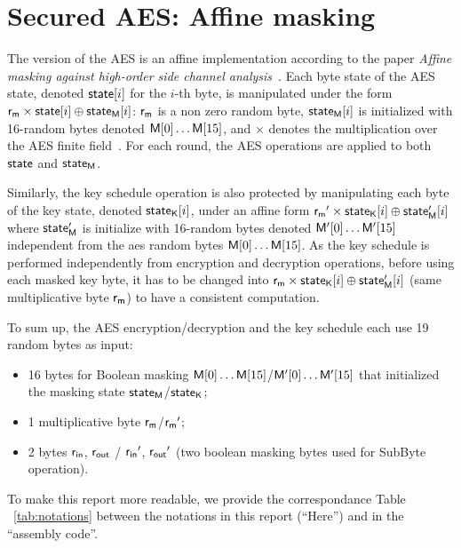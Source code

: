 \section{Secured AES: Affine masking}
\label{sec:secured_aes}
The version of the AES is an affine implementation according to the paper \emph{Affine masking against high-order side channel analysis}~\cite{FMPR10a}. 
Each byte state of the AES state, denoted $\mathsf{state}[i]$ for the $i$-th byte, is manipulated under the form $\mathsf{r_m} \times \mathsf{state}[i] \oplus \mathsf{state_M}[i]$: $\mathsf{r_m}$ is a non zero random byte, $\mathsf{state_M}[i]$ is initialized with 16-random bytes denoted $\mathsf{M}[0]\dots \mathsf{M}[15]$, and $\times$ denotes the multiplication over the AES finite field~\cite{FIPS197}. 
For each round, the AES operations are applied to both $\mathsf{state}$ and $\mathsf{state_M}$.

Similarly, the key schedule operation is also protected by manipulating each byte of the key state, denoted  $\mathsf{state_K}[i]$, under an affine form $\mathsf{r_m}' \times \mathsf{state_K}[i] \oplus \mathsf{state'_{M}}[i]$ where $\mathsf{state'_{M}}$ is initialize with 16-random bytes denoted $ \mathsf{M'}[0] \dots \mathsf{M'}[15]$ independent from the aes random bytes $\mathsf{M}[0]\dots \mathsf{M}[15]$. As the key schedule is performed independently from encryption and decryption operations, before using each masked key byte,
it has to be changed into $\mathsf{r_m} \times \mathsf{state_K}[i] \oplus \mathsf{state'_{M}}[i]$ (same multiplicative byte $\mathsf{r_m}$) to have a consistent computation. 

To sum up, the AES encryption/decryption and the key schedule each use 19 random bytes as input:
\begin{itemize}
\item 16 bytes for Boolean masking $\mathsf{M}[0]\dots \mathsf{M}[15]$/$\mathsf{M'}[0]\dots \mathsf{M'}[15]$ that initialized the masking state $\mathsf{state_M}$/$\mathsf{state_K}$;
\item 1 multiplicative byte $\mathsf{r_m}$/$\mathsf{r_m}'$;
\item 2 bytes $\mathsf{r_{in}} $, $\mathsf{r_{out}}$ / $\mathsf{r_{in}}'$, $\mathsf{r_{out}}'$ (two boolean masking bytes used for SubByte operation). 
\end{itemize}
  
To make this report more readable, we provide the correspondance Table ~\ref{tab:notations} between the notations  in this report (``Here'') and in the ``assembly code''.  

